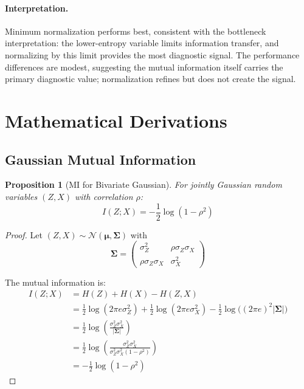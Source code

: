 \documentclass[10pt]{article} %
\theoremstyle{plain}
\newtheorem{proposition}[theorem]{Proposition}
\theoremstyle{definition}
\newcommand{\MI}{I}
\newcommand{\Ent}{H}
\begin{document}
\paragraph{Interpretation.} Minimum normalization performs best, consistent with the bottleneck interpretation: the lower-entropy variable limits information transfer, and normalizing by this limit provides the most diagnostic signal. The performance differences are modest, suggesting the mutual information itself carries the primary diagnostic value; normalization refines but does not create the signal.

\section{Mathematical Derivations}
\label{app:derivations}

\subsection{Gaussian Mutual Information}

\begin{proposition}[MI for Bivariate Gaussian]
\label{prop:mi-gaussian}
For jointly Gaussian random variables $(Z, X)$ with correlation $\rho$:
\begin{equation}
\MI(Z; X) = -\frac{1}{2}\log(1 - \rho^2)
\end{equation}
\end{proposition}

\begin{proof}
Let $(Z, X) \sim \mathcal{N}(\boldsymbol{\mu}, \boldsymbol{\Sigma})$ with
\[
\boldsymbol{\Sigma} = \begin{pmatrix} \sigma_Z^2 & \rho\sigma_Z\sigma_X \\ \rho\sigma_Z\sigma_X & \sigma_X^2 \end{pmatrix}
\]

The mutual information is:
\begin{align}
\MI(Z; X) &= \Ent(Z) + \Ent(X) - \Ent(Z, X) \\
&= \frac{1}{2}\log(2\pi e \sigma_Z^2) + \frac{1}{2}\log(2\pi e \sigma_X^2) - \frac{1}{2}\log\bigl((2\pi e)^2 |\boldsymbol{\Sigma}|\bigr) \\
&= \frac{1}{2}\log\left(\frac{\sigma_Z^2 \sigma_X^2}{|\boldsymbol{\Sigma}|}\right) \\
&= \frac{1}{2}\log\left(\frac{\sigma_Z^2 \sigma_X^2}{\sigma_Z^2\sigma_X^2(1-\rho^2)}\right) \\
&= -\frac{1}{2}\log(1 - \rho^2)
\end{align}
\end{proof}
\end{document}
